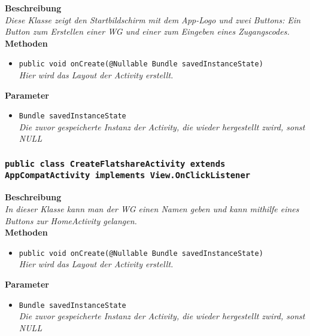 	\textbf{Beschreibung} \\
	\textit{Diese Klasse zeigt den Startbildschirm mit dem App-Logo und zwei Buttons: Ein Button zum Erstellen einer WG und einer zum Eingeben eines Zugangscodes.} \\

	\textbf{Methoden}
	\begin{itemize}
		\item\texttt{{public void onCreate(@Nullable Bundle savedInstanceState)}}\\
	\textit{Hier wird das Layout der Activity erstellt.}\\
	\end{itemize}

	\textbf{Parameter}
	\begin{itemize}
		\item\texttt{Bundle savedInstanceState}\\ 
	\textit{Die zuvor gespeicherte Instanz der Activity, die wieder hergestellt zwird, sonst NULL}\\
	\end{itemize}       

\subsubsection{\texttt{public class CreateFlatshareActivity extends AppCompatActivity implements View.OnClickListener}}

	\textbf{Beschreibung} \\
	\textit{In dieser Klasse kann man der WG einen Namen geben und kann mithilfe eines Buttons zur HomeActivity gelangen.} \\

	\textbf{Methoden}
	\begin{itemize}
		\item\texttt{{public void onCreate(@Nullable Bundle savedInstanceState)}}\\
	\textit{Hier wird das Layout der Activity erstellt.}\\
	\end{itemize}

	\textbf{Parameter}
	\begin{itemize}
		\item\texttt{Bundle savedInstanceState}\\ 
	\textit{Die zuvor gespeicherte Instanz der Activity, die wieder hergestellt zwird, sonst NULL}\\
	\end{itemize}      

